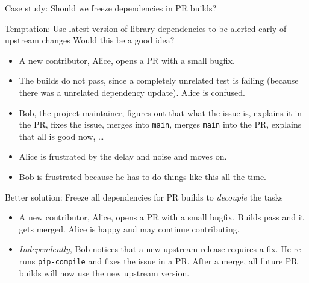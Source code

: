 \documentclass[english,aspectratio=1610,smaller]{beamer}
\newcommand{\scipp}{\texttt{scipp}\xspace}
\newcommand{\scippnexus}{\texttt{scippnexus}\xspace}
\begin{document}
\begin{frame}{Case study: Should we freeze dependencies in PR builds?}
  \begin{block}{Temptation: Use latest version of library dependencies to be alerted early of upstream changes}
    Would this be a good idea?
    \pause
  \begin{itemize}[<+->]
    \item A new contributor, Alice, opens a PR with a small bugfix.
    \item The builds do not pass, since a completely unrelated test is failing (because there was a unrelated dependency update).
      Alice is confused.
    \item Bob, the project maintainer, figures out that what the issue is, explains it in the PR, fixes the issue, merges into \texttt{main}, merges \texttt{main} into the PR, explains that all is good now, \dots
    \item Alice is frustrated by the delay and noise and moves on.
    \item Bob is frustrated because he has to do things like this all the time.
  \end{itemize}
  \end{block}
  \pause
  \begin{block}{Better solution: Freeze all dependencies for PR builds to \emph{decouple} the tasks}
    \begin{itemize}
      \item A new contributor, Alice, opens a PR with a small bugfix. Builds pass and it gets merged. Alice is happy and may continue contributing.
      \item \emph{Independently}, Bob notices that a new upstream release requires a fix.
        He re-runs \texttt{pip-compile} and fixes the issue in a PR.
        After a merge, all future PR builds will now use the new upstream version.
    \end{itemize}
  \end{block}
\end{frame}
\end{document}
